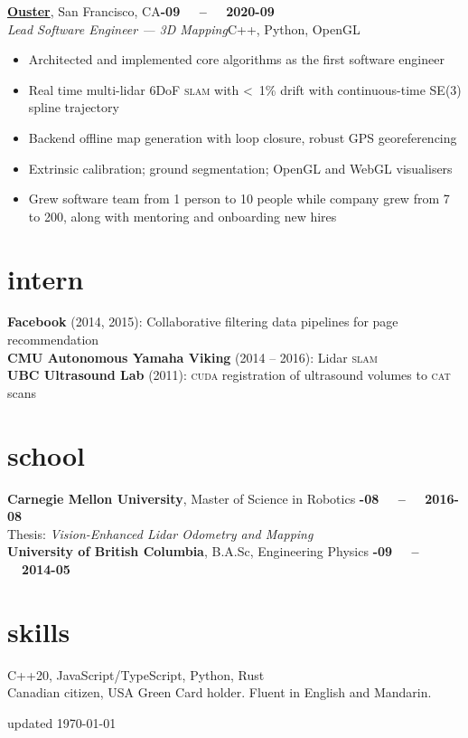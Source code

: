\documentclass[margin,10pt]{res}
\begin{document}
\begin{resume}
    \href{https://ouster.com}{\textbf{Ouster}}, San Francisco, CA\hfill \textsc{\bfseries{}-09~~ -- ~~2020-09}\\
    \textit{Lead Software Engineer --- 3D Mapping}\hfill C++, Python, OpenGL
    \vspace{0.5em}
    \begin{itemize}
        \item Architected and implemented core algorithms as the first software engineer
        \item Real time multi-lidar 6DoF \textsc{slam} with <~1\% drift with continuous-time SE(3) spline trajectory
        \item Backend offline map generation with loop closure, robust GPS georeferencing
        \item Extrinsic calibration; ground segmentation; OpenGL and WebGL visualisers
        \item Grew software team from 1 person to 10 people while company grew from 7 to 200, along with mentoring and onboarding new hires
    \end{itemize}
\section{\sc \lsstyle intern}
    \textbf{Facebook} (2014, 2015): Collaborative filtering data pipelines for page recommendation\\
    \textbf{CMU Autonomous Yamaha Viking} (2014 -- 2016): Lidar \textsc{slam} \\
    \textbf{UBC Ultrasound Lab} (2011): \textsc{cuda} registration of ultrasound volumes to \textsc{cat} scans
\section{\sc \lsstyle school}
    \textbf{Carnegie Mellon University}, Master of Science in Robotics \hfill \textsc{\bfseries{}-08~~ -- ~~2016-08}\\
    Thesis: \textit{Vision-Enhanced Lidar Odometry and Mapping}\vspace{3pt}\\
    \textbf{University of British Columbia}, B.A.Sc, Engineering Physics \hfill \textsc{\bfseries{}-09~~ -- ~~2014-05}\\
\section{\sc \lsstyle skills}
    C++20, JavaScript/TypeScript, Python, Rust \\
    Canadian citizen, USA Green Card holder. Fluent in English and Mandarin.\\
\end{resume}
\begin{minipage}[t]{\textwidth}
    \flushright
    \small
    \sc \lsstyle
    \hfill updated \today
\end{minipage}
\end{document}
